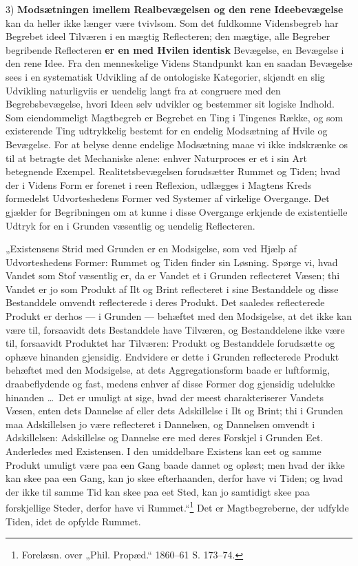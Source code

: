 \documentclass[11pt]{book}
\newcommand{\opage}[1]{\marginnote{\footnotesize\textit{[#1]}}}
\begin{document}
3) \textbf{Modsætningen imellem Realbevægelsen og den rene
Ideebevægelse} kan da heller ikke længer være tvivlsom. Som det
fuldkomne Vidensbegreb har Begrebet ideel Tilværen i en mægtig
Reflecteren; den mægtige, alle Begreber begribende Reflecteren
\textbf{er en med Hvilen identisk} Bevægelse, en Bevægelse i den rene
Idee. Fra den menneskelige Videns Standpunkt
\opage{206} \setcounter{footnote}{0}%
kan en saadan Bevægelse sees i en systematisk Udvikling af de
ontologiske Kategorier, skjøndt en slig Udvikling naturligviis er
uendelig langt fra at congruere med den Begrebsbevægelse, hvori Ideen
selv udvikler og bestemmer sit logiske Indhold. Som eiendommeligt
Magtbegreb er Begrebet en Ting i Tingenes Række, og som existerende
Ting udtrykkelig bestemt for en endelig Modsætning af Hvile og
Bevægelse. For at belyse denne endelige Modsætning maae vi ikke
indskrænke os til at betragte det Mechaniske alene: enhver Naturproces
er et i sin Art betegnende Exempel. Realitetsbevægelsen forudsætter
Rummet og Tiden; hvad der i Videns Form er forenet i reen Reflexion,
udlægges i Magtens Kreds formedelst Udvorteshedens Former ved Systemer
af virkelige Overgange. Det gjælder for Begribningen om at kunne i
disse Overgange erkjende de existentielle Udtryk for en i Grunden
væsentlig og uendelig Reflecteren.

„Existensens Strid med Grunden er en Modsigelse, som ved Hjælp af
Udvorteshedens Former: Rummet og Tiden finder sin Løsning. Spørge vi,
hvad Vandet som Stof væsentlig er, da er Vandet et i Grunden
reflecteret Væsen; thi Vandet er jo som Produkt af Ilt og Brint
reflecteret i sine Bestanddele og disse Bestanddele omvendt
reflecterede i deres Produkt. Det saaledes reflecterede Produkt er
derhos --- i Grunden --- behæftet med den Modsigelse, at det ikke kan
være til, forsaavidt dets Bestanddele have Tilværen, og Bestanddelene
ikke være til, forsaavidt Produktet har Tilværen: Produkt og
Bestanddele forudsætte og ophæve hinanden gjensidig. Endvidere er dette
i Grunden reflecterede Produkt behæftet med den Modsigelse, at dets
Aggregationsform baade er luftformig, draabeflydende og fast, medens
enhver af disse Former dog gjensidig udelukke hinanden \dots\ Det er
umuligt at sige, hvad der meest charakteriserer Vandets Væsen, enten
dets Dannelse af eller dets Adskillelse i Ilt og Brint; thi i Grunden
maa Adskillelsen jo være reflecteret i Dannelsen, og Dannelsen omvendt
i Adskillelsen: Adskillelse og Dannelse ere med deres Forskjel i
\opage{207} \setcounter{footnote}{0}%
Grunden Eet. Anderledes med Existensen. I den umiddelbare Existens kan
eet og samme Produkt umuligt være paa een Gang baade dannet og opløst;
men hvad der ikke kan skee paa een Gang, kan jo skee efterhaanden,
derfor have vi Tiden; og hvad der ikke til samme Tid kan skee paa eet
Sted, kan jo samtidigt skee paa forskjellige Steder, derfor have vi
Rummet.“\footnote{Forelæsn. over „Phil. Propæd.“ 1860--61 S. 173--74.}
Det er Magtbegreberne, der udfylde Tiden, idet de opfylde Rummet.
\end{document}
